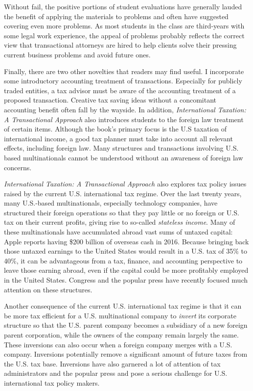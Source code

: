 Without fail, the positive portions of student evaluations have generally lauded the benefit of applying the materials to problems and often have suggested covering even more problems.  As most students in the class are third-years with some legal work experience, the appeal of problems probably reflects the correct view that transactional attorneys are hired to help clients solve their pressing current business problems and avoid future ones.  

Finally, there are two other novelties that readers may find useful.  I incorporate some introductory accounting treatment of transactions.  Especially for publicly traded entities, a tax advisor must be aware of the accounting treatment of a proposed transaction.  Creative tax saving ideas without a concomitant accounting benefit often fall by the wayside.  In addition,  \textit{International Taxation: A Transactional Approach} also introduces students to the foreign law treatment of certain items.  Although the book's primary focus is the U.S taxation of international income, a good tax planner must take into account all relevant effects, including foreign law.  Many structures and transactions involving U.S. based multinationals cannot be understood without an awareness of foreign law concerns.

\textit{International Taxation: A Transactional Approach} also explores tax policy issues raised by the current U.S. international tax regime.  Over the last twenty years, many U.S.-based multinationals, especially technology companies, have structured their foreign operations so that they pay little or no foreign or U.S. tax on their current profits, giving rise to so-called \emph{stateless income}.  Many of these multinationals have accumulated abroad vast sums of untaxed capital: Apple reports having \$200 billion of overseas cash in 2016. Because bringing back those untaxed earnings to the United States would result in a U.S. tax of 35\% to 40\%, it can be advantageous from a tax, finance, and accounting perspective to leave those earning abroad, even if the capital could be more profitably employed in the United States.  Congress and the popular press have recently focused much attention on these structures.  

Another consequence of the current U.S. international tax regime is that it can be more tax efficient for a U.S. multinational company to \textit{invert} its corporate structure so that the U.S. parent company becomes a subsidiary of a new foreign parent corporation, while the owners of the company remain largely the same.  These inversions can also occur when a foreign company merges with a U.S. company.  Inversions potentially remove a significant amount of future taxes from the U.S. tax base.  Inversions have also garnered a lot of attention of tax administrators and the popular press and pose a serious challenge for U.S. international tax policy makers.     

